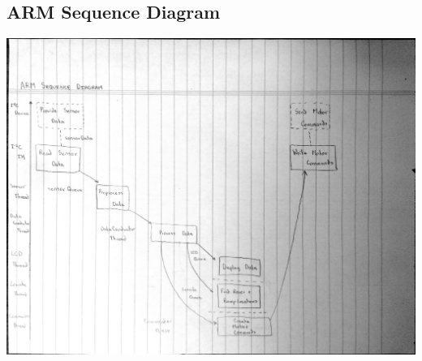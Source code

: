 \subsection*{ARM Sequence Diagram}
\begin{center}
	\includegraphics[scale=0.5]{Images/ARMSequenceDiagram}
\end{center}


